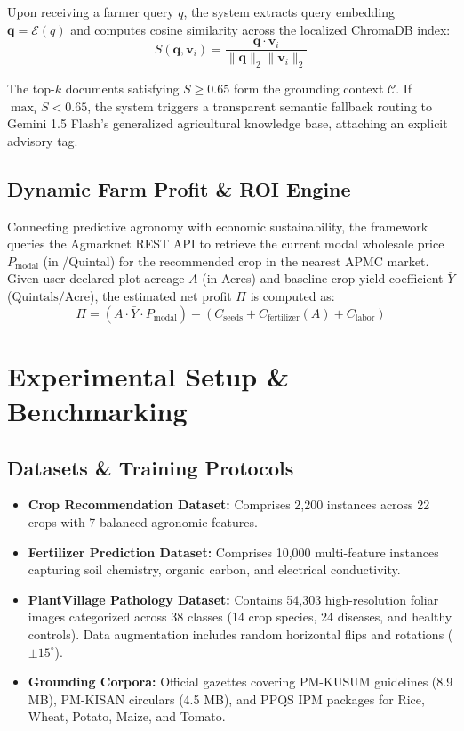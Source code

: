 \documentclass[conference]{IEEEtran}
\begin{document}
Upon receiving a farmer query $q$, the system extracts query embedding $\mathbf{q} = \mathcal{E}(q)$ and computes cosine similarity across the localized ChromaDB index:
\begin{equation}
S(\mathbf{q}, \mathbf{v}_i) = \frac{\mathbf{q} \cdot \mathbf{v}_i}{\|\mathbf{q}\|_2 \|\mathbf{v}_i\|_2}
\end{equation}

The top-$k$ documents satisfying $S \ge 0.65$ form the grounding context $\mathcal{C}$. If $\max_i S < 0.65$, the system triggers a transparent semantic fallback routing to Gemini 1.5 Flash's generalized agricultural knowledge base, attaching an explicit advisory tag.

\subsection{Dynamic Farm Profit & ROI Engine}
Connecting predictive agronomy with economic sustainability, the framework queries the Agmarknet REST API to retrieve the current modal wholesale price $P_{\text{modal}}$ (in \textcurrency/Quintal) for the recommended crop in the nearest APMC market. Given user-declared plot acreage $A$ (in Acres) and baseline crop yield coefficient $\bar{Y}$ ($\text{Quintals/Acre}$), the estimated net profit $\Pi$ is computed as:
\begin{equation}
\Pi = \left( A \cdot \bar{Y} \cdot P_{\text{modal}} \right) - \left( C_{\text{seeds}} + C_{\text{fertilizer}}(A) + C_{\text{labor}} \right)
\end{equation}

\section{Experimental Setup & Benchmarking}

\subsection{Datasets & Training Protocols}
\begin{itemize}
    \item \textbf{Crop Recommendation Dataset:} Comprises 2,200 instances across 22 crops with 7 balanced agronomic features.
    \item \textbf{Fertilizer Prediction Dataset:} Comprises 10,000 multi-feature instances capturing soil chemistry, organic carbon, and electrical conductivity.
    \item \textbf{PlantVillage Pathology Dataset:} Contains 54,303 high-resolution foliar images categorized across 38 classes (14 crop species, 24 diseases, and healthy controls). Data augmentation includes random horizontal flips and rotations ($\pm 15^\circ$).
    \item \textbf{Grounding Corpora:} Official gazettes covering PM-KUSUM guidelines (8.9 MB), PM-KISAN circulars (4.5 MB), and PPQS IPM packages for Rice, Wheat, Potato, Maize, and Tomato.
\end{itemize}
\end{document}
